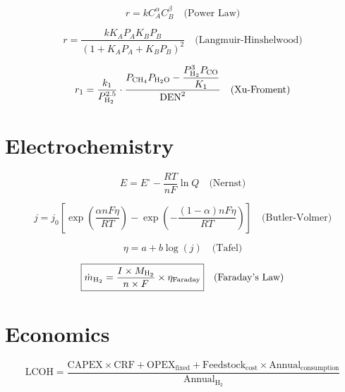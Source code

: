 \documentclass[12pt,twoside,openany]{book}
\begin{document}
\begin{dmath}
\boxed{r = k C_A^{\alpha} C_B^{\beta}} \quad \text{(Power Law)}
\end{dmath}

\begin{dmath}
\boxed{r = \frac{k K_A P_A K_B P_B}{(1 + K_A P_A + K_B P_B)^2}} \quad \text{(Langmuir-Hinshelwood)}
\end{dmath}

\begin{dmath}
r_1 = \frac{k_1}{P_{\ce{H2}}^{2.5}}
      \cdot \frac{P_{\ce{CH4}} P_{\ce{H2O}}
              - \dfrac{P_{\ce{H2}}^3 P_{\ce{CO}}}{K_1}}{\text{DEN}^2}
      \quad \text{(Xu-Froment)}
\end{dmath}

\section{Electrochemistry}

\begin{dmath}
\boxed{E = E^{\circ} - \frac{RT}{nF} \ln Q} \quad \text{(Nernst)}
\end{dmath}

\begin{dmath}
\boxed{j = j_0 \left[\exp\!\left(\frac{\alpha nF\eta}{RT}\right)
          - \exp\!\left(-\frac{(1-\alpha)nF\eta}{RT}\right)\right]}
          \quad \text{(Butler-Volmer)}
\end{dmath}

\begin{dmath}
\boxed{\eta = a + b \log(j)} \quad \text{(Tafel)}
\end{dmath}

\begin{dmath}
\boxed{\dot{m}_{\ce{H2}} = \frac{I \times M_{\ce{H2}}}{n \times F}
                           \times \eta_{\text{Faraday}}} \quad \text{(Faraday's Law)}
\end{dmath}

\section{Economics}

\begin{dmath}
\boxed{\text{LCOH} = \frac{\text{CAPEX} \times \text{CRF}
    + \text{OPEX}_{\text{fixed}}
    + \text{Feedstock}_{\text{cost}} \times \text{Annual}_{\text{consumption}}}
    {\text{Annual}_{\text{H}_2}}}
\end{dmath}
\end{document}
